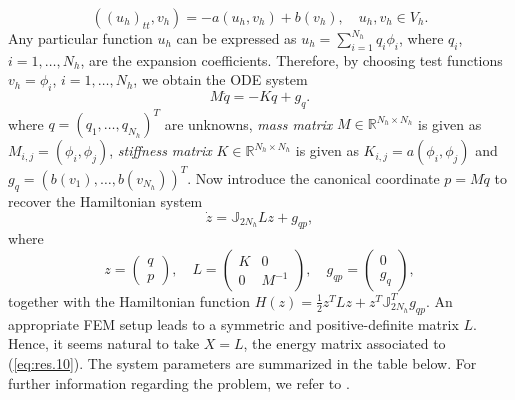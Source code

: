 \begin{equation} \label{eq:res.8}
	((u_h)_{tt},v_h) = - a(u_h,v_h) + b(v_h),\quad u_h,v_h\in V_h.
\end{equation}
Any particular function $u_h$ can be expressed as $u_h = \sum_{i=1}^{N_h} q_i \phi_i$, where $q_i$, $i=1,\dots,N_h$, are the expansion coefficients. Therefore, by choosing test functions $v_h = \phi_i$, $i=1,\dots,N_h$, we obtain the ODE system
\begin{equation} \label{eq:res.9}
	M\ddot q = -K q + g_{q}.
\end{equation}
where $q=(q_1,\dots,q_{N_h})^T$ are unknowns, \emph{mass matrix} $M\in \mathbb R^{N_h\times N_h}$ is given as $M_{i,j} = (\phi_i,\phi_j)$, \emph{stiffness matrix} $K\in \mathbb R^{N_h\times N_h}$ is given as $K_{i,j} = a(\phi_i,\phi_j)$ and $g_q=(b(v_1),\dots,b(v_{N_h}))^T$. Now introduce the canonical coordinate $p = M\dot q$ to recover the Hamiltonian system
\begin{equation} \label{eq:res.10}
	\dot z = \mathbb J_{2N_h} Lz + g_{qp},
\end{equation}
where
\begin{equation} \label{eq:res.11}
	z = 
	\begin{pmatrix}
	q \\
	p	
	\end{pmatrix}, \quad 
	L = 
	\begin{pmatrix}
	K & 0 \\
	0 & M^{-1}
	\end{pmatrix}, \quad
	g_{qp} =
	\begin{pmatrix}
	0 \\
	g_q
	\end{pmatrix},
\end{equation}
together with the Hamiltonian function $H(z) = \frac{1}{2} z^TLz + z^T \mathbb J_{2N_h}^T g_{qp}$. An appropriate FEM setup leads to a symmetric and positive-definite matrix $L$. Hence, it seems natural to take $X=L$, the energy matrix associated to (\ref{eq:res.10}). The system parameters are summarized in the table below. For further information regarding the problem, we refer to \cite{langtangen2017solving}.

